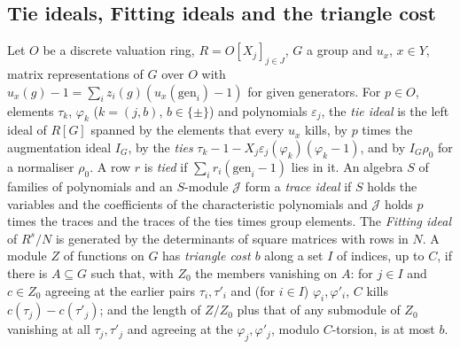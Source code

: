 \subsection{Tie ideals, Fitting ideals and the triangle cost}\label{ss:tie-ideals}
Let $O$ be a discrete valuation ring, $R=O[X_j]_{j\in J}$, $G$ a group and $u_x$, $x\in Y$, matrix representations of $G$ over $O$ with $u_x(g)-1=\sum_iz_i(g)(u_x(\mathrm{gen}_i)-1)$ for given generators. For $p\in O$, elements
$\tau_k$, $\varphi_k$ ($k=(j,b)$, $b\in\{\pm\}$) and polynomials $\varepsilon_j$, the \emph{tie ideal} is the left ideal of $R[G]$ spanned by the elements that every $u_x$ kills, by $p$ times the augmentation ideal $I_G$, by
the \emph{ties} $\tau_k-1-X_j\varepsilon_j(\varphi_k)(\varphi_k-1)$, and by $I_G\rho_0$ for a normaliser $\rho_0$. A row $r$ is \emph{tied} if $\sum_ir_i(\mathrm{gen}_i-1)$ lies in it. An algebra $S$ of families of polynomials and an $S$-module
$\mathcal J$ form a \emph{trace ideal} if $S$ holds the variables and the coefficients of the characteristic polynomials and $\mathcal J$ holds $p$ times the traces and the traces of the ties times group elements. The
\emph{Fitting ideal} of $R^s/N$ is generated by the determinants of square matrices with rows in $N$. A module $Z$ of functions on $G$ has \emph{triangle cost $b$} along a set $I$ of indices, up to $C$, if there is
$A\subseteq G$ such that, with $Z_0$ the members vanishing on $A$: for $j\in I$ and $c\in Z_0$ agreeing at the earlier pairs $\tau_i,\tau'_i$ and (for $i\in I$) $\varphi_i,\varphi'_i$, $C$ kills $c(\tau_j)-c(\tau'_j)$; and the length of
$Z/Z_0$ plus that of any submodule of $Z_0$ vanishing at all $\tau_j,\tau'_j$ and agreeing at the $\varphi_j,\varphi'_j$, modulo $C$-torsion, is at most $b$.
